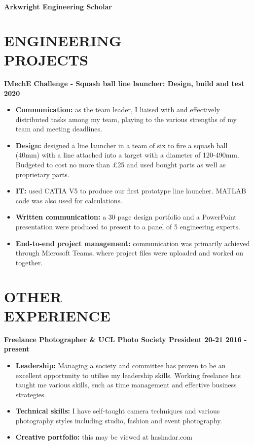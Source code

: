 \documentclass[margin, 10pt]{res} %
\begin{document}
\begin{resume}
\textbf{Arkwright Engineering Scholar}


\section{ENGINEERING \\ PROJECTS}

\textbf{IMechE Challenge - Squash ball line launcher: Design, build and test \hfill 2020}
\\
\begin{itemize}
  \item \textbf{Communication:} as the team leader, I liaised with and effectively distributed tasks among my team, playing to the various strengths of my team and meeting deadlines.
  \item \textbf{Design:} designed a line launcher in a team of six to fire a squash ball (40\si{\milli\meter}) with a line attached into a target with a diameter of 120-490\si{\milli\meter}. Budgeted to cost no more than £25 and used bought parts as well as proprietary parts.
  \item \textbf{IT:} used CATIA V5 to produce our first prototype line launcher. MATLAB code was also used for calculations. 
  \item \textbf{Written communication:} a 30 page design portfolio and a PowerPoint presentation were produced to present to a panel of 5 engineering experts. 
  \item \textbf{End-to-end project management:} communication was primarily achieved through Microsoft Teams, where project files were uploaded and worked on together. 
\end{itemize}
 
 
 
\section{OTHER \\ EXPERIENCE}
\textbf{Freelance Photographer \& UCL Photo Society President 20-21 \hfill 2016 - present}
\\
\begin{itemize}
  \item \textbf{Leadership:} Managing a society and committee has proven to be an excellent opportunity to utilise my leadership skills. Working freelance has taught me various skills, such as time management and effective business strategies.
  \item \textbf{Technical skills:} I have self-taught camera techniques and various photography styles including studio, fashion and event photography.
  \item \textbf{Creative portfolio:} this may be viewed at hashadar.com
\end{itemize}


\end{resume}
\end{document}
